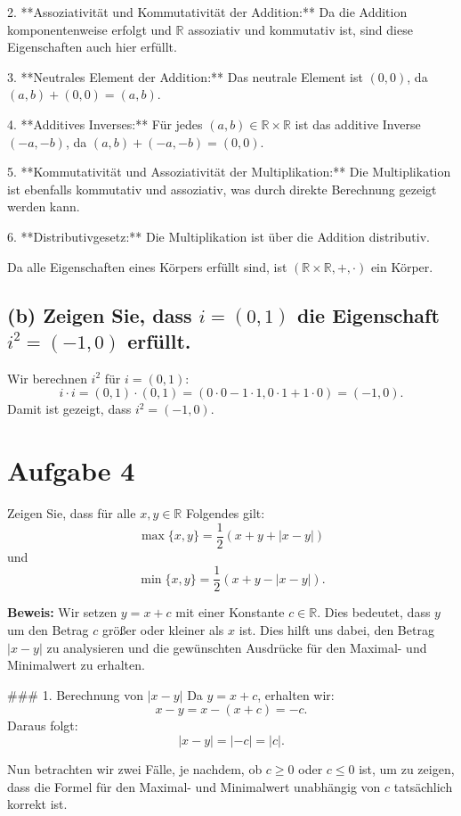 \documentclass[11pt]{article}
\begin{document}
2. **Assoziativität und Kommutativität der Addition:** Da die Addition komponentenweise erfolgt und \( \mathbb{R} \) assoziativ und kommutativ ist, sind diese Eigenschaften auch hier erfüllt.

3. **Neutrales Element der Addition:** Das neutrale Element ist \( (0, 0) \), da \( (a, b) + (0, 0) = (a, b) \).

4. **Additives Inverses:** Für jedes \( (a, b) \in \mathbb{R} \times \mathbb{R} \) ist das additive Inverse \( (-a, -b) \), da \( (a, b) + (-a, -b) = (0, 0) \).

5. **Kommutativität und Assoziativität der Multiplikation:** Die Multiplikation ist ebenfalls kommutativ und assoziativ, was durch direkte Berechnung gezeigt werden kann.

6. **Distributivgesetz:** Die Multiplikation ist über die Addition distributiv.

Da alle Eigenschaften eines Körpers erfüllt sind, ist \( (\mathbb{R} \times \mathbb{R}, +, \cdot) \) ein Körper.

\subsection*{(b) Zeigen Sie, dass \( i = (0, 1) \) die Eigenschaft \( i^2 = (-1, 0) \) erfüllt.}

Wir berechnen \( i^2 \) für \( i = (0, 1) \):
\[
i \cdot i = (0, 1) \cdot (0, 1) = (0 \cdot 0 - 1 \cdot 1, 0 \cdot 1 + 1 \cdot 0) = (-1, 0).
\]
Damit ist gezeigt, dass \( i^2 = (-1, 0) \).

   \section*{Aufgabe 4}
Zeigen Sie, dass für alle \( x, y \in \mathbb{R} \) Folgendes gilt:
\[
\max\{x, y\} = \frac{1}{2} (x + y + |x - y|)
\]
und
\[
\min\{x, y\} = \frac{1}{2} (x + y - |x - y|).
\]

\textbf{Beweis:} Wir setzen \( y = x + c \) mit einer Konstante \( c \in \mathbb{R} \). Dies bedeutet, dass \( y \) um den Betrag \( c \) größer oder kleiner als \( x \) ist. Dies hilft uns dabei, den Betrag \( |x - y| \) zu analysieren und die gewünschten Ausdrücke für den Maximal- und Minimalwert zu erhalten.

### 1. Berechnung von \( |x - y| \)
Da \( y = x + c \), erhalten wir:
\[
x - y = x - (x + c) = -c.
\]
Daraus folgt:
\[
|x - y| = | - c | = |c|.
\]

Nun betrachten wir zwei Fälle, je nachdem, ob \( c \geq 0 \) oder \( c \leq 0 \) ist, um zu zeigen, dass die Formel für den Maximal- und Minimalwert unabhängig von \( c \) tatsächlich korrekt ist.
\end{document}
